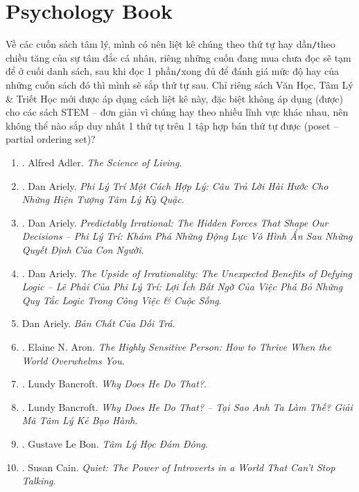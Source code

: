\documentclass{article}
\begin{document}
\section{Psychology Book}
Về các cuốn sách tâm lý, mình có nên liệt kê chúng theo thứ tự hay dần\texttt{/}theo chiều tăng của sự tâm đắc cá nhân, riêng những cuốn đang mua chưa đọc sẽ tạm để ở cuối danh sách, sau khi đọc 1 phần\texttt{/}xong đủ để đánh giá mức độ hay của những cuốn sách đó thì mình sẽ sắp thứ tự sau. Chỉ riêng sách Văn Học, Tâm Lý \& Triết Học mới được áp dụng cách liệt kê này, đặc biệt không áp dụng (được) cho các sách STEM -- đơn giản vì chúng hay theo nhiều lĩnh vực khác nhau, nên không thể nào sắp duy nhất 1 thứ tự trên 1 tập hợp bán thứ tự được (poset -- partial ordering set)?
\begin{enumerate}
	\item \cite{Adler2013}. Alfred Adler. \textit{The Science of Living}.\hfill{\sf[done]}
	\item \cite{Ariely_reasonably_irrational}. Dan Ariely. \textit{Phi Lý Trí Một Cách Hợp Lý: Câu Trả Lời Hài Hước Cho Những Hiện Tượng Tâm Lý Kỳ Quặc}.\hfill{\sf[done]}
	\item \cite{Ariely_predictably_irrational}. Dan Ariely. \textit{Predictably Irrational: The Hidden Forces That Shape Our Decisions -- Phi Lý Trí: Khám Phá Những Động Lực Vô Hình Ẩn Sau Những Quyết Định Của Con Người}.\hfill{\sf[done]}
	\item \cite{Ariely_upside_rationality}. Dan Ariely. \textit{The Upside of Irrationality: The Unexpected Benefits of Defying Logic -- Lẽ Phải Của Phi Lý Trí: Lợi Ích Bất Ngờ Của Việc Phá Bỏ Những Quy Tắc Logic Trong Công Việc \& Cuộc Sống}.\hfill{\sf[done]}
	\item Dan Ariely. \textit{Bản Chất Của Dối Trá}.\hfill{\sf[reading]}
	\item \cite{Aron2013}. Elaine N. Aron. \textit{The Highly Sensitive Person: How to Thrive When the World Overwhelms You}.\hfill{\sf[done]}
	\item \cite{Bancroft2003}. Lundy Bancroft. \textit{Why Does He Do That?}.\hfill{\sf[reading]}
	\item \cite{Bancroft2019}. Lundy Bancroft. \textit{Why Does He Do That? -- Tại Sao Anh Ta Làm Thế? Giải Mã Tâm Lý Kẻ Bạo Hành}.\hfill{\sf[done]}
	\item \cite{Bon2022}. Gustave Le Bon. \textit{Tâm Lý Học Đám Đông}.\hfill{\sf[done]}
	\item \cite{Cain2013}. Susan Cain. \textit{Quiet: The Power of Introverts in a World That Can't Stop Talking}.\hfill{\sf[reading]}

\end{enumerate}
\end{document}
